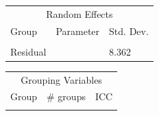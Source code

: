 \begin{table}[!h]
\centering
\begin{tabular}{lll}
\toprule
\multicolumn{3}{c}{Random Effects} \\
\cmidrule(l{3pt}r{3pt}){1-3}
Group & Parameter & Std. Dev.\\
\midrule
\cellcolor{gray!6}{PID} & \cellcolor{gray!6}{(Intercept)} & \cellcolor{gray!6}{12.811}\\
Residual &  & 8.362\\
\bottomrule
\end{tabular}
\end{table} \begin{table}[!h]
\centering
\begin{tabular}{lrl}
\toprule
\multicolumn{3}{c}{Grouping Variables} \\
\cmidrule(l{3pt}r{3pt}){1-3}
Group & \# groups & ICC\\
\midrule
\cellcolor{gray!6}{PID} & \cellcolor{gray!6}{23} & \cellcolor{gray!6}{0.701}\\
\bottomrule
\end{tabular}
\end{table}

